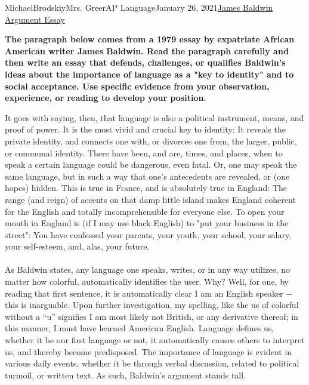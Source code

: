 \documentclass[12pt,letterpaper]{article}
\begin{document}
\begin{mla}{Michael}{Brodskiy}{Mrs. Greer}{AP Language}{January 26, 2021}{\underline{James Baldwin Argument Essay}} 

  \begin{justify}
    \textbf{The paragraph below comes from a 1979 essay by expatriate African American writer James Baldwin. Read the paragraph carefully and then write an essay that defends, challenges, or qualifies Baldwin's ideas about the importance of language as a "key to identity" and to social acceptance. Use specific evidence from your observation, experience, or reading to develop your position.}\\
  \end{justify}

  \begin{justify}
It goes with saying, then, that language is also a political instrument, means, and proof of power. It is the most vivid and crucial key to identity: It reveals the private identity, and connects one with, or divorces one from, the larger, public, or communal identity. There have been, and are, times, and places, when to speak a certain language could be dangerous, even fatal. Or, one may speak the same language, but in such a way that one's antecedents are revealed, or (one hopes) hidden. This is true in France, and is absolutely true in England: The range (and reign) of accents on that damp little island makes England coherent for the English and totally incomprehensible for everyone else. To open your mouth in England is (if I may use black English) to "put your business in the street": You have confessed your parents, your youth, your school, your salary, your self-esteem, and, alas, your future.
  \end{justify}
  
  \hline

  \begin{justify}

    \paragraph{} As Baldwin states, any language one speaks, writes, or in any way utilizes, no matter how colorful, automatically identifies the user. Why? Well, for one, by reading that first sentence, it is automatically clear I am an English speaker $-$ this is inarguable. Upon further investigation, my spelling, like the us of colorful without a ``u'' signifies I am most likely not British, or any derivative thereof; in this manner, I must have learned American English. Language defines us, whether it be our first language or not, it automatically causes others to interpret us, and thereby become predisposed. The importance of language is evident in various daily events, whether it be through verbal discussion, related to political turmoil, or written text. As such, Baldwin's argument stands tall.  \\


\end{justify}
\end{mla}
\end{document}

